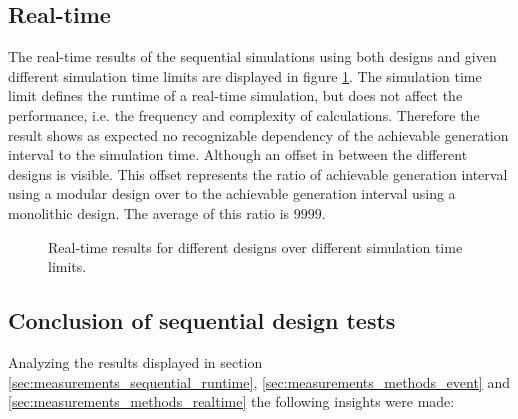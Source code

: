 \subsection{Real-time}
\label{sec:measurements_sequential_realtime}

The real-time results of the sequential simulations using both designs and given different simulation time limits are displayed in figure \ref{fig:results_realtime_sim_time}.
The simulation time limit defines the runtime of a real-time simulation, but does not affect the performance, i.e. the frequency and complexity of calculations.
Therefore the result shows as expected no recognizable dependency of the achievable generation interval to the simulation time.
Although an offset in between the different designs is visible.
This offset represents the ratio of achievable generation interval using a modular design over to the achievable generation interval using a monolithic design.
The average of this ratio is $9999$.\\

\begin{figure}
    \centering
    \caption{Real-time results for different designs over different simulation time limits.}
    \label{fig:results_realtime_sim_time}
\end{figure}

\subsection{Conclusion of sequential design tests}
\label{sec:measurements_sequential_conclusion}

Analyzing the results displayed in section \ref{sec:measurements_sequential_runtime}, \ref{sec:measurements_methods_event} and \ref{sec:measurements_methods_realtime} the following insights were made:

